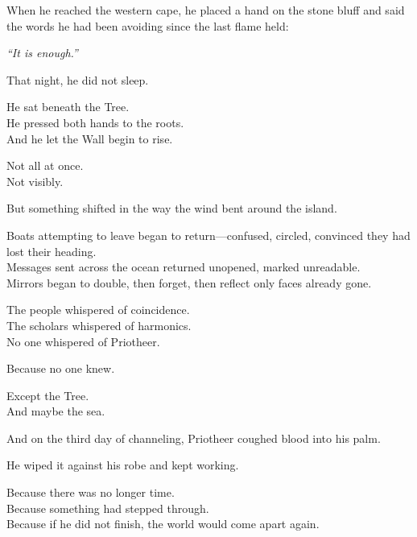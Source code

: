 \documentclass[9pt]{article}
\begin{document}
\vspace{0.5em}
When he reached the western cape, he placed a hand on the stone bluff and said the words he had been avoiding since the last flame held:

\vspace{0.5em}
\textit{``It is enough.''}

\vspace{0.5em}
That night, he did not sleep.

\vspace{0.5em}
He sat beneath the Tree.\\
He pressed both hands to the roots.\\
And he let the Wall begin to rise.

\vspace{0.5em}
Not all at once.\\
Not visibly.

\vspace{0.5em}
But something shifted in the way the wind bent around the island.

\vspace{0.5em}
Boats attempting to leave began to return---confused, circled, convinced they had lost their heading.\\
Messages sent across the ocean returned unopened, marked unreadable.\\
Mirrors began to double, then forget, then reflect only faces already gone.

\vspace{0.5em}
The people whispered of coincidence.\\
The scholars whispered of harmonics.\\
No one whispered of Priotheer.

\vspace{0.5em}
Because no one knew.

\vspace{0.5em}
Except the Tree.\\
And maybe the sea.

\vspace{0.5em}
And on the third day of channeling, Priotheer coughed blood into his palm.

\vspace{0.5em}
He wiped it against his robe and kept working.

\vspace{0.5em}
Because there was no longer time.\\
Because something had stepped through.\\
Because if he did not finish, the world would come apart again.
\end{document}
